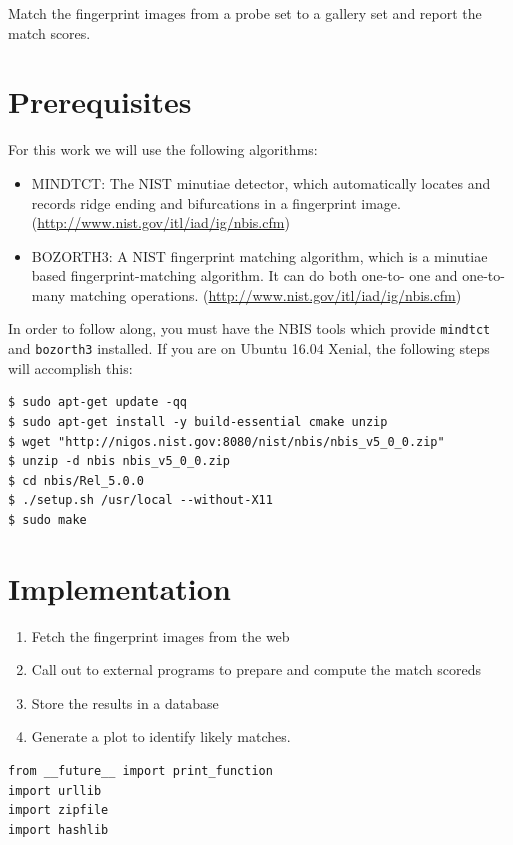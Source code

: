 Match the fingerprint images from a probe set to a gallery set and
report the match scores.

\section{Prerequisites}\label{prerequisites}

For this work we will use the following algorithms:

\begin{itemize}
\item
  MINDTCT: The NIST minutiae detector, which automatically locates and
  records ridge ending and bifurcations in a fingerprint image.
  (\url{http://www.nist.gov/itl/iad/ig/nbis.cfm})
\item
  BOZORTH3: A NIST fingerprint matching algorithm, which is a minutiae
  based fingerprint-matching algorithm. It can do both one-to- one and
  one-to- many matching operations.
  (\url{http://www.nist.gov/itl/iad/ig/nbis.cfm})
\end{itemize}

In order to follow along, you must have the NBIS tools which provide
\texttt{mindtct} and \texttt{bozorth3} installed. If you are on Ubuntu
16.04 Xenial, the following steps will accomplish this:

\begin{lstlisting}
$ sudo apt-get update -qq
$ sudo apt-get install -y build-essential cmake unzip
$ wget "http://nigos.nist.gov:8080/nist/nbis/nbis_v5_0_0.zip"
$ unzip -d nbis nbis_v5_0_0.zip
$ cd nbis/Rel_5.0.0
$ ./setup.sh /usr/local --without-X11
$ sudo make
\end{lstlisting} 

\section{Implementation}\label{implementation}

\begin{enumerate}
\item Fetch the fingerprint images from the web
\item Call out to external programs to prepare and compute the match
  scoreds
\item Store the results in a database
\item Generate a plot to identify likely matches.
\end{enumerate}

\begin{lstlisting}
from __future__ import print_function
import urllib
import zipfile
import hashlib
\end{lstlisting}

